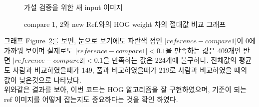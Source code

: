 \documentclass[a4paper]{article}
\begin{document}
\begin{figure}
    \centering
    \quad
    \centering
    \quad
    \centering
    \caption{가설 검증을 위한 새 input 이미지}
\label{fig:newRefImg}
\end{figure}

\begin{figure}
    \begin{center}
        \caption{compare 1, 2와 new Ref.와의 HOG weight 차의 절대값 비교 그래프}
        \label{fig:newRefSubABSGraph}
    \end{center}
\end{figure}
그래프 Figure~\ref{fig:newRefSubABSGraph}를 보면, 눈으로 보기에도 파란색 점인 $|reference - compare1|$이 0에 가까워 보이며 실제로도 $|reference - compare1|<0.1$을 만족하는 값은 409개인 반면 $|reference - compare2|<0.1$을 만족하는 값은 224개에 불구하다. 전체값의 평균도 사람과 비교하였을때가 149, 풀과 비교하였을때가 219로 사람과 비교하였을 때의 값이 낮은것으로 나타났다.\\
위와같은 결과를 보아, 이번 코드는 HOG 알고리즘을 잘 구현하였으며, 기준이 되는 ref 이미지를 어떻게 잡는지도 중요하다는 것을 확인 하였다.
\end{document}
